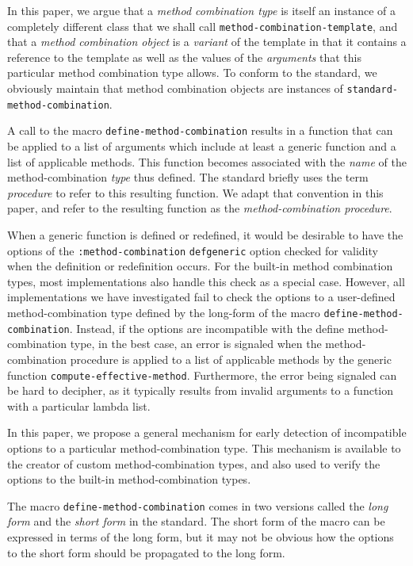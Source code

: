 In this paper, we argue that a \emph{method combination type} is
itself an instance of a completely different class that we shall call
\texttt{method-combination-template}, and that a \emph{method
  combination object} is a \emph{variant} of the template in that it
contains a reference to the template as well as the values of the
\emph{arguments} that this particular method combination type allows.
To conform to the standard, we obviously maintain that method
combination objects are instances of
\texttt{standard-method-combination}.

A call to the macro \texttt{define-method-combination} results in a
function that can be applied to a list of arguments which include at
least a generic function and a list of applicable methods.  This
function becomes associated with the \emph{name} of the
method-combination \emph{type} thus defined.  The standard briefly
uses the term \emph{procedure} to refer to this resulting function.
We adapt that convention in this paper, and refer to the resulting
function as the \emph{method-combination procedure}.

When a generic function is defined or redefined, it would be desirable
to have the options of the \texttt{:method-combination}
\texttt{defgeneric} option checked for validity when the definition or
redefinition occurs.  For the built-in method combination types, most
implementations also handle this check as a special case.  However,
all implementations we have investigated fail to check the options to
a user-defined method-combination type defined by the long-form of the
macro \texttt{define-method-combination}.  Instead, if the options are
incompatible with the define method-combination type, in the best
case, an error is signaled when the method-combination procedure is
applied to a list of applicable methods by the generic function
\texttt{compute-effective-method}.  Furthermore, the error being
signaled can be hard to decipher, as it typically results from invalid
arguments to a function with a particular lambda list.

In this paper, we propose a general mechanism for early detection of
incompatible options to a particular method-combination type.  This
mechanism is available to the creator of custom method-combination
types, and also used to verify the options to the built-in
method-combination types.

The macro \texttt{define-method-combination} comes in two versions
called the \emph{long form} and the \emph{short form} in the
\commonlisp{} standard.  The short form of the macro can be expressed
in terms of the long form, but it may not be obvious how the options
to the short form should be propagated to the long form.

